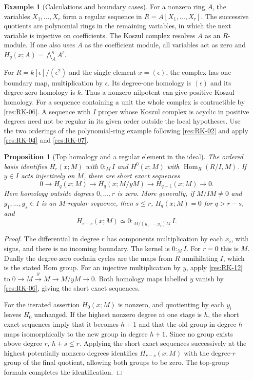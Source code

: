 \documentclass[11pt,oneside,openany]{book}
\newtheorem{proposition}[theorem]{Proposition}
\theoremstyle{definition}
\newtheorem{example}[theorem]{Example}
\theoremstyle{remark}
\begin{document}
\begin{example}[Calculations and boundary cases]\label{res:RK-13}
For a nonzero ring $A$, the variables $X_1,\ldots,X_r$ form
a regular sequence in $R=A[X_1,\ldots,X_r]$. The successive
quotients are polynomial rings in the remaining variables,
in which the next variable is injective on coefficients. The Koszul
complex resolves $A$ as an $R$-module. If one also uses $A$ as
the coefficient module, all variables act as zero and
$H_q(x;A)=\bigwedge_A^q A^r$.

For $R=k[\epsilon]/(\epsilon^2)$ and the single element
$x=(\epsilon)$, the complex has one boundary map, multiplication
by $\epsilon$. Its degree-one homology is $(\epsilon)$ and its
degree-zero homology is $k$. Thus a nonzero nilpotent can give
positive Koszul homology. For a sequence containing a unit the
whole complex is contractible by \ref{res:RK-06}. A sequence with
$I$ proper whose Koszul complex is acyclic in positive degrees
need not be regular in its given order outside the local
hypotheses. Use the two orderings of the polynomial-ring example
following \ref{res:RK-02} and apply \ref{res:RK-04} and
\ref{res:RK-07}.
\end{example}

\begin{proposition}[Top homology and a regular element in the ideal]
\label{res:RK-14}
The ordered basis identifies $H_r(x;M)$ with $0:_M I$ and
$H^0(x;M)$ with $\operatorname{Hom}_R(R/I,M)$.
If $y\in I$ acts injectively on $M$, there are short exact
sequences
\[
 0\longrightarrow H_q(x;M)\longrightarrow H_q(x;M/yM)
   \longrightarrow H_{q-1}(x;M)\longrightarrow0.
\]
Here homology outside degrees $0,\ldots,r$ is zero. More generally,
if $M/IM\ne0$ and $y_1,\ldots,y_s\in I$ is an $M$-regular sequence,
then $s\le r$,
$H_q(x;M)=0$ for $q>r-s$, and
\[
 H_{r-s}(x;M)\simeq
 0:_{\,M/(y_1,\ldots,y_s)M}I.
\]
\end{proposition}
\begin{proof}
The differential in degree $r$ has components multiplication
by each $x_i$, with signs, and there is no incoming boundary.
The kernel is $0:_M I$. For $r=0$ this is $M$. Dually the
degree-zero cochain cycles are the maps from $R$ annihilating $I$,
which is the stated Hom group. For an injective multiplication
by $y$, apply \ref{res:RK-12} to
$0\to M\xrightarrow{y}M\to M/yM\to0$. Both homology maps
labelled $y$ vanish by \ref{res:RK-06}, giving the short
exact sequences.

For the iterated assertion $H_0(x;M)$
is nonzero, and quotienting by each $y_i$ leaves $H_0$
unchanged. If the highest nonzero degree at one stage is $h$,
the short exact sequences imply that it becomes $h+1$ and
that the old group in degree $h$ maps isomorphically to the
new group in degree $h+1$. Since no group exists above degree $r$,
$h+s\le r$. Applying the short exact sequences successively at
the highest potentially nonzero degrees identifies
$H_{r-s}(x;M)$ with the degree-$r$ group of the final quotient,
allowing both groups to be zero. The top-group formula completes
the identification.
\end{proof}
\end{document}
